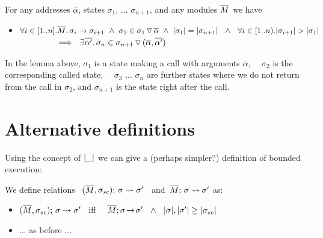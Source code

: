  
\begin{lemma}
\label{lemma:arguments}
For any addresses $\overline \alpha$, states $\sigma_1$, ... $\sigma_{n+1}$, and any modules $\Mtwo$ we have
\begin{itemize}
\item
$\forall i\in [1..n]. \Mtwo, \sigma_i \rightarrow \sigma_{i+1}\  \wedge\   \sigma_2\in \PushSLong{ \overline \alpha} {\sigma_1} \ \wedge \ \depth {\sigma_{1}}=\depth{\sigma_{n+1}}\ \ \wedge \ \  \forall i\in [1..n). \depth {\sigma_{i+1}} > \depth {\sigma_{1}}\  $\\
$\strut \ \ \ \ \ \ \ \ \ \ \ \ \  \Longrightarrow\ \  \exists \overline {\alpha'}. \, \sigma_{n}\in \PushSLong { (\overline \alpha,  \overline {\alpha'})} {\sigma_{n+1}}$

\end{itemize}
\end{lemma}


In the lemma above, $\sigma_1$ is a state making a call with arguments $\overline \alpha$, \ \ $\sigma_2$ is the corresponding called state, \ \ $\sigma_3$ ... $\sigma_{n}$ are further states where we do not return from the call in $\sigma_2$, and $\sigma_{n+1}$ is the state right after the call.


\section{Alternative definitions}

Using the concept of $\depth {\_}$ we can give a (perhaps simpler?) definition of bounded execution:

\begin{definition}
\label{def:shallow:term}
We define relations \    $\leadstoBoundedThree {\Mtwo} {\sigma} {\sigma\bd} {\sigma'}$ \ and\  $\leadstoBounded  {\Mtwo} {\sigma} {\sigma'}$ as:

\begin{itemize}
\item
 $\leadstoBoundedThree {\Mtwo} {\sigma} {\sigma\bd}  {\sigma'}$ \    iff \ \   $\leadstoOrig {\Mtwo} {\sigma} {\sigma'} %
\ \  \wedge \ \    \depth{\sigma}, \depth{\sigma'}\geq  \depth{\sigma\bd}$ 
\item
... as before ...
 \end{itemize}
\end{definition}

